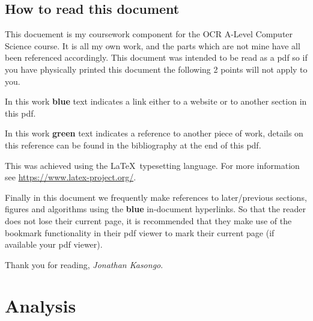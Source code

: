 \pagestyle{fancy}
\chead{\mdseries \thepage}

\section*{How to read this document}

This docuement is my coursework component for the OCR A-Level
Computer Science course. It is all my own work, and the parts
which are not mine have all been referenced accordingly. This 
document was intended to be read as a pdf so if you have 
physically printed this document the following
2 points will not apply to you.\\ \vspace{0.2cm}

In this work { \color{blue} \textbf{blue} } text indicates a
link either to a website or to another section in this pdf. \\
\vspace{0.2cm}

In this work { \color{green} \textbf{green} } text indicates a
reference to another piece of work, details on this reference
can be found in the bibliography at the end of this pdf.\\
\vspace{0.2cm}

This was achieved using the \LaTeX \ typesetting language.
For more information see \url{https://www.latex-project.org/}.
\\ \vspace{0.2cm}

Finally in this document we frequently make references to
later/previous sections, figures and algorithms using the
{ \color{blue} \textbf{blue} } in-document hyperlinks. So
that the reader does not lose their current page, it 
is recommended that they make use of the bookmark functionality 
in their pdf viewer to mark their current page 
(if available your pdf viewer). \\ \vspace{0.2cm}

Thank you for reading, \textit{Jonathan Kasongo}.

\chapter{Analysis}

